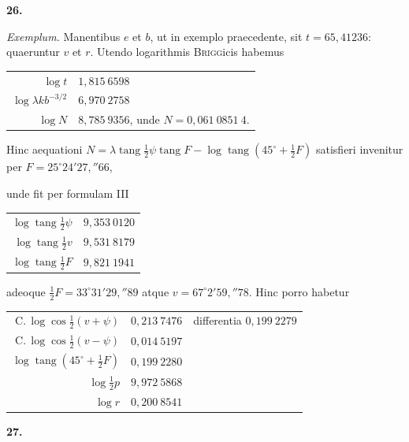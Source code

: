 \documentclass[12pt,a4paper]{book}
\newcommand{\tang}{\operatorname{tang}}
\newcommand{\Compl}{\mathrm{C.}\,}
\begin{document}
\textbf{26.}

\textit{Exemplum.} Manentibus $e$ et $b$, ut in exemplo praecedente, sit $t=65{,}41236$: quaeruntur $v$ et $r$. Utendo logarithmis \textsc{Brigg}icis habemus

\begin{center}
\begin{tabular}{@{}r@{\quad}l@{}}
$\log t$ & $1{,}815\ 6598$ \\
$\log\lambda kb^{-3/2}$ & $6{,}970\ 2758$ \\
$\log N$ & $8{,}785\ 9356$, unde $N=0{,}061\ 0851\ 4$.
\end{tabular}
\end{center}

Hinc aequationi $N=\lambda\tang\tfrac{1}{2}\psi\tang F-\log\tang(45^{\circ}+\tfrac{1}{2}F)$ satisfieri invenitur per $F=25^{\circ}24'27{,}''66$,

unde fit per formulam III

\begin{center}
\begin{tabular}{@{}r@{\quad}l@{}}
$\log\tang\tfrac{1}{2}\psi$ & $9{,}353\ 0120$ \\
$\log\tang\tfrac{1}{2}v$ & $9{,}531\ 8179$ \\
$\log\tang\tfrac{1}{2}F$ & $9{,}821\ 1941$
\end{tabular}
\end{center}

adeoque $\tfrac{1}{2}F=33^{\circ}31'29{,}''89$ atque $v=67^{\circ}2'59{,}''78$. Hinc porro habetur

\begin{center}
\begin{tabular}{@{}r@{\quad}l@{\quad}|@{\quad}l@{}}
$\Compl\log\cos\tfrac{1}{2}(v+\psi)$ & $0{,}213\ 7476$ & differentia $0{,}199\ 2279$ \\
$\Compl\log\cos\tfrac{1}{2}(v-\psi)$ & $0{,}014\ 5197$ & \\
$\log\tang(45^{\circ}+\tfrac{1}{2}F)$ & $0{,}199\ 2280$ & \\
$\log\tfrac{1}{2}p$ & $9{,}972\ 5868$ & \\
$\log r$ & $0{,}200\ 8541$ &
\end{tabular}
\end{center}

\textbf{27.}
\end{document}
